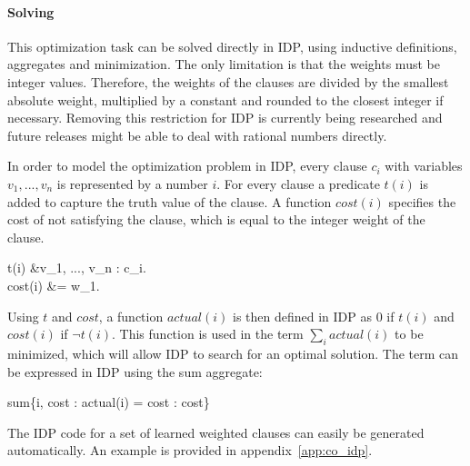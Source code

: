 \paragraph{Solving}
This optimization task can be solved directly in IDP, using inductive definitions, aggregates and minimization.
The only limitation is that the weights must be integer values.
Therefore, the weights of the clauses are divided by the smallest absolute weight, multiplied by a constant and rounded to the closest integer if necessary.
Removing this restriction for IDP is currently being researched and future releases might be able to deal with rational numbers directly.

In order to model the optimization problem in IDP, every clause $c_i$ with variables $v_1, ..., v_n$ is represented by a number $i$. For every clause a predicate $t(i)$ is added to capture the truth value of the clause.
A function $\mathit{cost}(i)$ specifies the cost of not satisfying the clause, which is equal to the integer weight of the clause.
\begin{shiftedflalign*}
	t(i) &\Leftrightarrow \forall v_1, ..., v_n : c_i. \\
	cost(i) &= w_1.
\end{shiftedflalign*}

Using $t$ and $\mathit{cost}$, a function $\mathit{actual}(i)$ is then defined in IDP as 0 if $t(i)$ and $\mathit{cost}(i)$ if $\lnot t(i)$.
This function is used in the term $\sum_i actual(i)$ to be minimized, which will allow IDP to search for an optimal solution.
The term can be expressed in IDP using the sum aggregate:
\begin{shiftedflalign*}
	sum\{i, cost : actual(i) = cost : cost\}
\end{shiftedflalign*}

The IDP code for a set of learned weighted clauses can easily be generated automatically.
An example is provided in appendix~\ref{app:co_idp}.